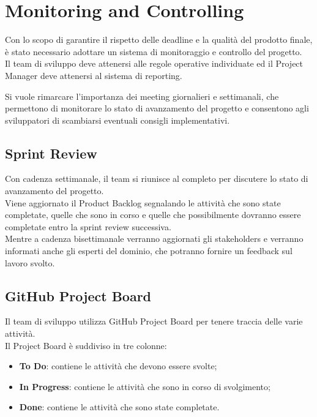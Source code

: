 \section{Monitoring and Controlling}
Con lo scopo di garantire il rispetto delle deadline e la qualità del prodotto finale, è stato necessario adottare un sistema di 
monitoraggio e controllo del progetto.\\

Il team di sviluppo deve attenersi alle regole operative individuate ed il Project Manager deve attenersi al sistema di reporting.

Si vuole rimarcare l'importanza dei meeting giornalieri e settimanali, che permettono di monitorare lo stato di avanzamento del 
progetto e consentono agli sviluppatori di scambiarsi eventuali consigli implementativi.\\


\subsection{Sprint Review}
Con cadenza settimanale, il team si riunisce al completo per discutere lo stato di avanzamento del progetto.\\

Viene aggiornato il Product Backlog segnalando le attività che sono state completate, quelle che sono in corso e quelle che 
possibilmente dovranno essere completate entro la sprint review successiva.\\

Mentre a cadenza bisettimanale verranno aggiornati gli stakeholders e verranno informati anche gli esperti del dominio, 
che potranno fornire un feedback sul lavoro svolto.\\

\subsection{GitHub Project Board}
Il team di sviluppo utilizza GitHub Project Board per tenere traccia delle varie attività.\\

Il Project Board è suddiviso in tre colonne:
\begin{itemize}
    \item \textbf{To Do}: contiene le attività che devono essere svolte;
    \item \textbf{In Progress}: contiene le attività che sono in corso di svolgimento;
    \item \textbf{Done}: contiene le attività che sono state completate.
\end{itemize}

